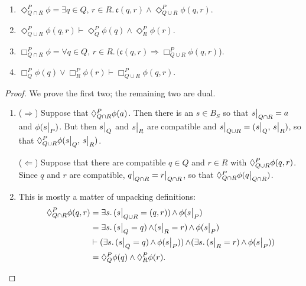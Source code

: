 \begin{prop}
~
\begin{enumerate}
    \item $\Diamond^P_{Q \cap R}\phi = \exists q \in Q,\, r \in R.\, \mathfrak{c}(q,r) \wedge \Diamond^P_{Q \cup R}\phi(q, r)$.
    \item $\Diamond^P_{Q \cup R} \phi(q, r) \vdash \Diamond^P_Q \phi(q) \wedge \Diamond^P_R \phi(r)$.
    \item $\Box^P_{Q \cap R}\phi = \forall q \in Q,\, r \in R.\, (\mathfrak{c}(q,r) \Rightarrow \Box^P_{Q \cup R}\phi(q, r)$).
    \item $\Box^P_Q \phi(q) \vee \Box^P_R \phi(r)  \vdash  \Box^P_{Q \cup R} \phi(q, r)$.
\end{enumerate}
\end{prop}
\begin{proof}
We prove the first two; the remaining two are dual.
\begin{enumerate}
    \item ($\Rightarrow$) Suppose that $\allows{P}{Q \cap R}\phi(a)$. Then there is an $s \in B_S$ so that $\rest{s}{Q \cap R} = a$ and $\phi(\rest{s}{P})$. But then $\rest{s}{Q}$ and $\rest{s}{R}$ are compatible and $\rest{s}{Q \cup R} = (\rest{s}{Q},\, \rest{s}{R})$, so that $\allows{P}{Q \cup R}\phi(\rest{s}{Q},\, \rest{s}{R})$.
    
    ($\Leftarrow$) Suppose that there are compatible $q \in Q$ and $r \in R$ with $\allows{P}{Q \cup R}\phi(q, r)$. Since $q$ and $r$ are compatible, $\rest{q}{Q \cap R} = \rest{r}{Q \cap R}$, so that $\allows{P}{Q \cap R}\phi(\rest{q}{Q \cap R})$.
    \item This is mostly a matter of unpacking definitions:
        \begin{align*}
            \allows{P}{Q \cap R}\phi(q, r) &= \exists s.\, (\rest{s}{Q \cup R} = (q, r)) \meet \phi(\rest{s}{P}) \\
                &= \exists s.\, (\rest{s}{Q} = q) \meet (\rest{s}{R} = r) \meet \phi(\rest{s}{P}) \\
                &\vdash (\exists s.\, (\rest{s}{Q} = q) \meet \phi(\rest{s}{P})) \meet (\exists s.\, (\rest{s}{R} = r) \meet \phi(\rest{s}{P})) \\
                &= \allows{P}{Q}\phi(q) \wedge \allows{P}{R}\phi(r). \qedhere
        \end{align*} 
\end{enumerate}
\end{proof}

